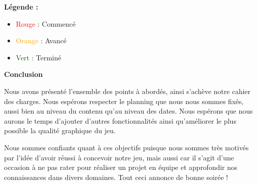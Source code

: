 \documentclass[a4paper, 11pt]{report}
\begin{document}
\vspace*{7mm}
\textbf{Légende :}
\begin{itemize}
  \item \textcolor{red}{Rouge} : Commencé
  \item \textcolor{orange}{Orange} : Avancé
  \item \textcolor{darkgreen}{Vert} : Terminé
\end{itemize}

\newpage
\textbf{{\huge Conclusion}} \vspace{7mm}

Nous avons présenté l’ensemble des points à abordés, ainsi s’achève notre cahier des charges.
Nous espérons respecter le planning que nous nous sommes fixés, aussi bien au niveau du contenu qu’au niveau des dates. Nous espérons que nous aurons le temps d’ajouter d’autres fonctionnalités ainsi qu’améliorer le plus possible la qualité graphique du jeu.

Nous sommes confiants quant à ces objectifs puisque nous sommes très motivés par l’idée d’avoir réussi à concevoir notre jeu, mais aussi car il s’agit d’une occasion à ne pas rater pour réaliser un projet en équipe et approfondir nos connaissances dans divers domaines. Tout ceci annonce de bonne soirée !
\end{document}
